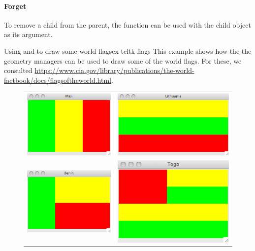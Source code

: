 \paragraph{Forget}
To remove a child from the parent, the  function can be used with the child object as its argument.


\begin{example}{Using  and  to draw some world flags}{ex-tcltk-flags}
This example shows how the  the  geometry managers can be used to draw some of the world flags. For these, we consulted \url{https://www.cia.gov/library/publications/the-world-factbook/docs/flagsoftheworld.html}.


\begin{figure}
  \centering
  \begin{tabular}{cc}
    \includegraphics[width=.4\textwidth]{fig-tcltk-mali.png}
    & %
    \includegraphics[width=.5\textwidth]{fig-tcltk-lithuania.png}
    \\
    \includegraphics[width=.4\textwidth]{fig-tcltk-benin.png}
    &
    \includegraphics[width=.4\textwidth]{fig-tcltk-togo.png}

\end{tabular}
\end{figure}
\end{example}
